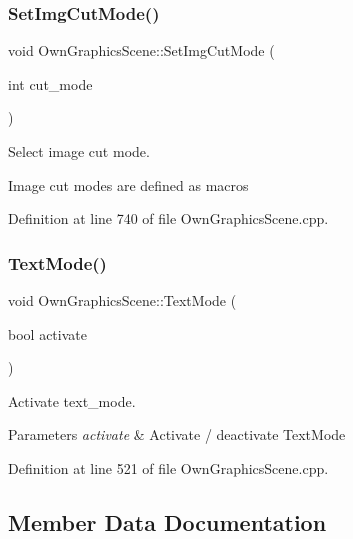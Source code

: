 \subsubsection{\texorpdfstring{Set\+Img\+Cut\+Mode()}{SetImgCutMode()}}
{\footnotesize\ttfamily void Own\+Graphics\+Scene\+::\+Set\+Img\+Cut\+Mode (\begin{DoxyParamCaption}\item[{int}]{cut\+\_\+mode }\end{DoxyParamCaption})}



Select image cut mode. 

Image cut modes are defined as macros 

Definition at line 740 of file Own\+Graphics\+Scene.\+cpp.

\mbox{\label{classOwnGraphicsScene_a6dd98dd7fd32a22016f4f8d4d6a8f400}} 
\subsubsection{\texorpdfstring{Text\+Mode()}{TextMode()}}
{\footnotesize\ttfamily void Own\+Graphics\+Scene\+::\+Text\+Mode (\begin{DoxyParamCaption}\item[{bool}]{activate }\end{DoxyParamCaption})}



Activate text\+\_\+mode. 


\begin{DoxyParams}{Parameters}
{\em activate} & Activate / deactivate Text\+Mode \\
\hline
\end{DoxyParams}


Definition at line 521 of file Own\+Graphics\+Scene.\+cpp.



\subsection{Member Data Documentation}
\mbox{\label{classOwnGraphicsScene_a511dd73ffc0a5f3ee28e8950d0636f5e}} 
